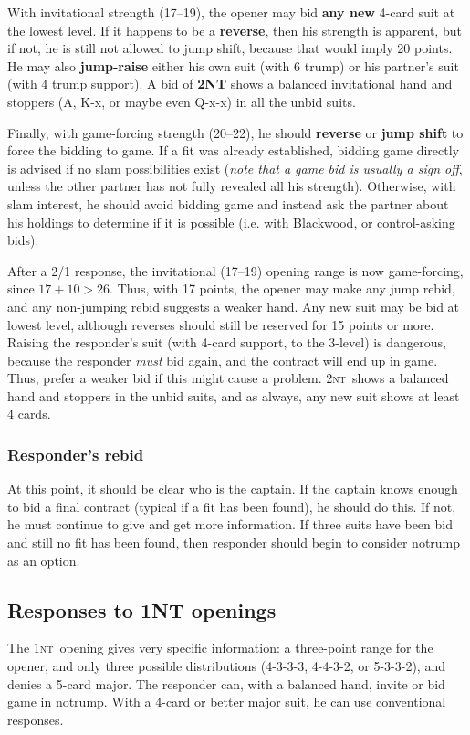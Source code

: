 \documentclass[11pt]{article}
\def\NT{\textsc{nt}}
\begin{document}
With invitational strength (17--19), the opener may bid \textbf{any
new} 4-card suit at the lowest level.  If it happens to be a \textbf{reverse},
then his strength is apparent, but if not, he is still not allowed to
jump shift, because that would imply 20 points.  He may also
\textbf{jump-raise} either his own suit (with 6 trump) or his partner's suit
(with 4 trump support).  A bid of \textbf{2NT} shows a balanced invitational
hand and stoppers (A, K-x, or maybe even Q-x-x) in all the unbid suits.

Finally, with game-forcing strength (20--22), he should
\textbf{reverse} or \textbf{jump shift} to force the bidding to game.
If a fit was already established, bidding game directly is advised if
no slam possibilities exist (\emph{note that a game bid is usually a sign
off}, unless the other partner has not fully revealed all his
strength).  Otherwise, with slam interest, he should avoid bidding
game and instead ask the partner about his holdings to determine if it
is possible (i.e. with Blackwood, or control-asking bids).

After a 2/1 response, the invitational (17--19) opening range is now
game-forcing, since $17+10>26$.  Thus, with 17 points, the opener may
make any jump rebid, and any non-jumping rebid suggests a weaker hand.
Any new suit may be bid at lowest level, although reverses should
still be reserved for 15 points or more.  Raising the responder's suit
(with 4-card support, to the 3-level) is dangerous, because the
responder \emph{must} bid again, and the contract will end up in game.
Thus, prefer a weaker bid if this might cause a problem.  2\NT\ shows
a balanced hand and stoppers in the unbid suits, and as always, any
new suit shows at least 4 cards.

\subsubsection{Responder's rebid}
At this point, it should be clear who is the captain.  If the captain
knows enough to bid a final contract (typical if a fit has been
found), he should do this.  If not, he must continue to give and get
more information.  If three suits have been bid and still no fit has
been found, then responder should begin to consider notrump as an
option.


\subsection{Responses to 1NT openings}
The 1\NT\ opening gives very specific information: a three-point
range for the opener, and only three possible distributions (4-3-3-3,
4-4-3-2, or 5-3-3-2), and denies a 5-card major.  The responder
can, with a balanced hand, invite or bid game in notrump.  With a 4-card
or better major suit, he can use conventional responses.
\end{document}
